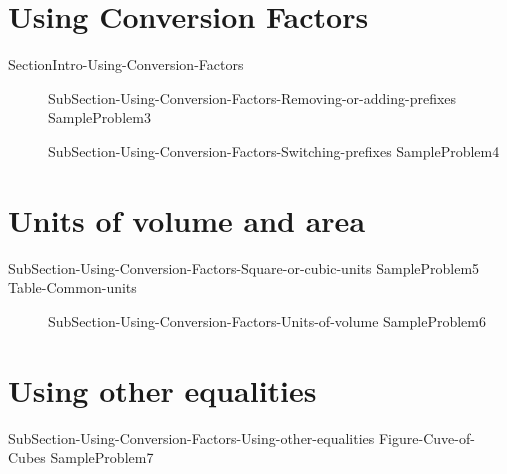 \documentclass[main.tex]{subfiles}
\newcommand\chapterlabel{Ch-measurements}\setcounter{figurenewcounter}{0}\setcounter{tablenewcounter}{0}\setcounter{formulanewcounter}{0}\chapterpicture{../{\chapterlabel}/figure1}\chapterpicturelabel{PngImg}
\begin{document}
\section{Using Conversion Factors}{SectionIntro-Using-Conversion-Factors}
\sloppy\begin{description}
\item[]{SubSection-Using-Conversion-Factors-Removing-or-adding-prefixes}
{SampleProblem3}%
\item[]{SubSection-Using-Conversion-Factors-Switching-prefixes}
{SampleProblem4}%
\end{description}

\section{Units of volume and area}{SubSection-Using-Conversion-Factors-Square-or-cubic-units}
{SampleProblem5}%
{Table-Common-units}
\sloppy\begin{description}
\item[]{SubSection-Using-Conversion-Factors-Units-of-volume}
{SampleProblem6}%
\end{description}


\section{Using other equalities}{SubSection-Using-Conversion-Factors-Using-other-equalities}
{Figure-Cuve-of-Cubes}
{SampleProblem7}%
\end{document}

